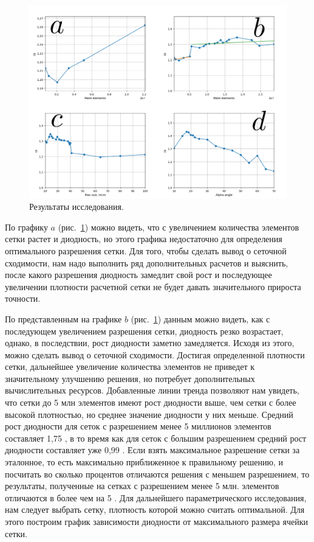 \documentclass[10pt,a4paper]{book}
\begin{document}
    \begin{figure}[H]
            \centering
            \includegraphics[width = 1\linewidth]{allGraph}
            \caption{Результаты исследования.}
            \label{fig:allGraph}
        \end{figure}
    
    По графику $a$ (рис.~\ref{fig:allGraph}) можно видеть, что с увеличением количества элементов сетки растет и диодность, но этого графика недостаточно для определения оптимального разрешения сетки. Для того, чтобы сделать вывод о сеточной сходимости, нам надо выполнить ряд дополнительных расчетов и выяснить, после какого разрешения диодность замедлит свой рост и последующее увеличении плотности расчетной сетки не будет давать значительного прироста точности. 
    
    По представленным на графике $b$ (рис.~\ref{fig:allGraph}) данным можно видеть, как с последующем увеличением разрешения сетки, диодность резко возрастает, однако, в последствии, рост диодности заметно замедляется. Исходя из этого, можно сделать вывод о сеточной сходимости. Достигая определенной плотности сетки, дальнейшее увеличение количества элементов не приведет к значительному улучшению решения, но потребует дополнительных вычислительных ресурсов. Добавленные линии тренда позволяют нам увидеть, что сетки до 5 млн элементов имеют рост диодности выше, чем сетки с более высокой плотностью, но среднее значение диодности у них меньше. Средний рост диодности для сеток с разрешением менее 5 миллионов элементов составляет 1,75 \textdiscount, в то время как для сеток с большим разрешением средний рост диодности составляет уже 0,99 \textdiscount. Если взять максимальное разрешение сетки за эталонное, то есть максимально приближенное к правильному решению, и посчитать во сколько процентов отличаются решения с меньшем разрешением, то результаты, полученные на сетках с разрешением менее 5 млн. элементов отличаются в более чем на 5 \textdiscount. Для дальнейшего параметрического исследования, нам следует выбрать сетку, плотность которой можно считать оптимальной. Для этого построим график зависимости диодности от максимального размера ячейки сетки.
    
\end{document}
